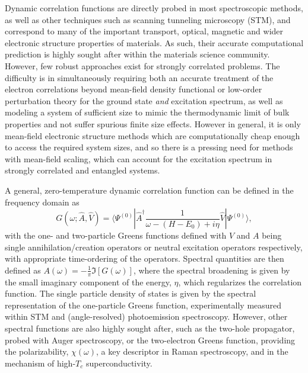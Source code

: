 \documentclass[aps,showpacs,twocolumn,nobibnotes]{revtex4}
\begin{document}
Dynamic correlation functions are directly probed in most spectroscopic methods, as well as other techniques such as scanning tunneling microscopy (STM), 
and correspond to many of the important transport, optical, magnetic and wider electronic structure properties of materials. 
As such, their accurate computational prediction is highly sought after within the materials science community. 
However, few robust approaches exist for strongly correlated problems\cite{Gali2013}. The difficulty is in simultaneously requiring both an accurate 
treatment of the electron correlations beyond mean-field density functional or low-order perturbation theory for the ground state {\em and} excitation spectrum, as well as modeling 
a system of sufficient size to mimic the thermodynamic limit of bulk properties and not suffer spurious finite size effects. 
However in general, it is only mean-field electronic structure methods which are computationally cheap enough to access the required system
sizes, and so there is a pressing need for methods with mean-field scaling, which can account for the excitation spectrum in strongly correlated 
and entangled systems.

A general, zero-temperature dynamic correlation function can be defined in the frequency domain as
\begin{equation}
    G(\omega;{\hat A},{\hat V}) = \langle \Psi^{(0)} | {\hat A}^{\dagger} \frac{1}{\omega-(H-E_0)+i \eta} {\hat V} | \Psi^{(0)} \rangle , \label{eqn:intCorrFunc}
\end{equation}
with the one- and two-particle Greens functions defined with $V$ and $A$ being single annihilation/creation operators or neutral excitation
operators respectively, with appropriate time-ordering of the operators. Spectral quantities are then defined as $A(\omega)=-\frac{1}{\pi}\Im[G(\omega)]$,
where the spectral broadening is given by the small imaginary component of the energy, $\eta$, which regularizes the correlation function. The single particle
density of states is given by the spectral representation of the one-particle Greens function, experimentally measured within STM 
and (angle-resolved) photoemission spectroscopy. However, other spectral functions are also highly sought after, such as the two-hole propagator, 
probed with Auger spectroscopy\cite{Mona2013}, or the two-electron Greens function, providing the polarizability, $\chi(\omega)$, a key descriptor in 
Raman spectroscopy, and in the mechanism of high-$T_c$ superconductivity\cite{Millis2012,Sordi2012,Millis2013}.
\end{document}
